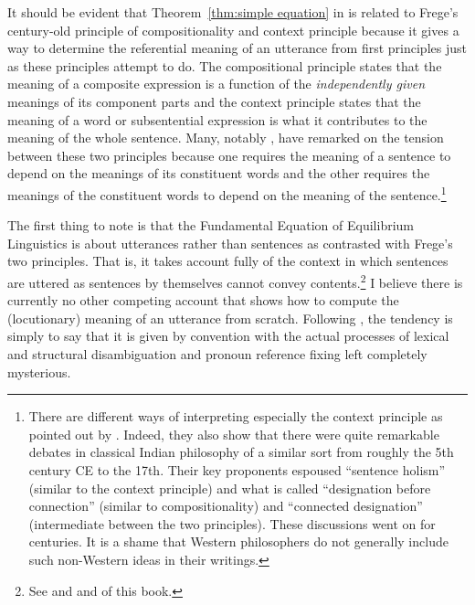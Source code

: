 It should be evident that Theorem~\ref{thm:simple equation} in  is related to Frege's century-old principle of compositionality and context principle because it gives a way to determine the referential meaning of an utterance from first principles just as these principles attempt to do. The compositional principle states that the meaning of a composite expression is a function of the \emph{independently given} meanings of its component parts and the context principle states that the meaning of a word or subsentential expression is what it contributes to the meaning of the whole sentence. Many, notably \citet[4--5]{dummett:f}, have remarked on the tension between these two principles because one requires the meaning of a sentence to depend on the meanings of its constituent words and the other requires the meanings of the constituent words to depend on the meaning of the sentence.\footnote{There are different ways of interpreting especially the context principle as pointed out by \citet{ms:cp}. Indeed, they also show that there were quite remarkable debates in classical Indian philosophy of a similar sort from roughly the 5th century CE to the 17th. Their key proponents espoused ``sentence holism'' (similar to the context principle) and what is called ``designation before connection'' (similar to compositionality) and ``connected designation'' (intermediate between the two principles). These discussions went on for centuries. It is a shame that Western philosophers do not generally include such non-Western ideas in their writings.}

The first thing to note is that the Fundamental Equation of Equilibrium Linguistics is about utterances rather than sentences as contrasted with Frege's two principles. That is, it takes account fully of the context in which sentences are uttered as sentences by themselves cannot convey contents.\footnote{See \citet{strawson:or} and \citet[20--21 and Section~2.7]{parikh:le} and  of this book.} I believe there is currently no other competing account that shows how to compute the (locutionary) meaning of an utterance from scratch. Following \citet{grice:sitwow}, the tendency is simply to say that it is given by convention with the actual processes of lexical and structural disambiguation and pronoun reference fixing left completely mysterious.

